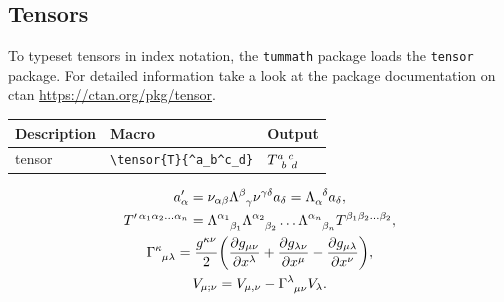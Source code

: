 \documentclass[DIV=13]{scrartcl}
\begin{document}
\subsection{Tensors}
To typeset tensors in index notation, the \texttt{tummath} package loads the
\texttt{tensor} package. For detailed information take a look at the package
documentation on ctan \url{https://ctan.org/pkg/tensor}.
\begin{center}
  \begin{tabular}{lll}
    \toprule
    \textbf{Description}     & \textbf{Macro}       & \textbf{Output} \\
    \midrule
    tensor & \verb|\tensor{T}{^a_b^c_d}| & $\tensor{T}{^a_b^c_d}$ \\
    \bottomrule
  \end{tabular}
\end{center}
\begin{gather}
  a^\prime_\alpha = \nu_{\alpha\beta}\tensor{\Lambda}{^\beta_\gamma}
  \nu^{\gamma\delta}a_\delta = \tensor{\Lambda}{_\alpha^\delta}a_\delta, \\
  T^{\prime\,\alpha_1\alpha_2\dots\alpha_n} =
  \tensor{\Lambda}{^{\alpha_1}_{\beta_1}}
  \tensor{\Lambda}{^{\alpha_2}_{\beta_2}}\dots
  \tensor{\Lambda}{^{\alpha_n}_{\beta_n}}T^{\beta_1\beta_2\dots\beta_2}, \\
  \tensor{\Gamma}{^\kappa_\mu_\lambda} = \frac{g^{\kappa\nu}}{2}
  \left(\pdd{g_{\mu\nu}}{x^\lambda}+\pdd{g_{\lambda\nu}}{x^\mu}-
    \pdd{g_{\mu\lambda}}{x^\nu}\right), \\
  V_{\mu;\nu}=V_{\mu,\nu}-\tensor{\Gamma}{^\lambda_\mu_\nu}V_\lambda.
\end{gather}
\end{document}
